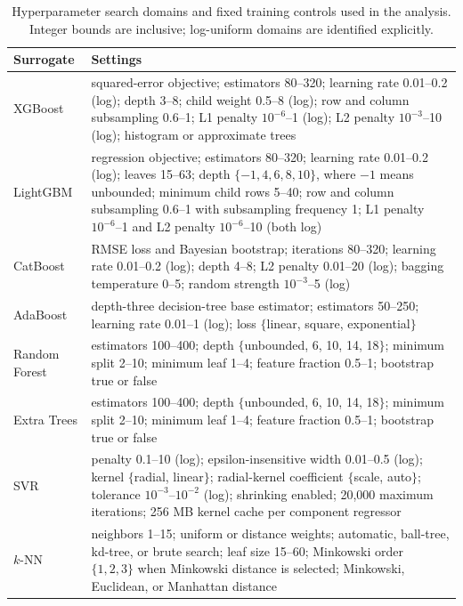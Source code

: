\documentclass[a4paper,fleqn]{cas-sc}
\newcommand{\csvcomma}{,}
\begin{document}
\begin{table}[htbp]
\centering
\caption{Hyperparameter search domains and fixed training controls used in the analysis. Integer bounds are inclusive; log-uniform domains are identified explicitly.}
\label{tab:model_hyperparameters}
\scriptsize
\setlength{\tabcolsep}{3pt}
\begin{tabular}{p{2.0cm}p{8.7cm}}
\hline
Surrogate & Settings \\
\hline
XGBoost & squared-error objective; estimators 80--320; learning rate 0.01--0.2 (log); depth 3--8; child weight 0.5--8 (log); row and column subsampling 0.6--1; L1 penalty $10^{-6}$--1 (log); L2 penalty $10^{-3}$--10 (log); histogram or approximate trees \\
LightGBM & regression objective; estimators 80--320; learning rate 0.01--0.2 (log); leaves 15--63; depth $\{-1\csvcomma{}4\csvcomma{}6\csvcomma{}8\csvcomma{}10\}$\csvcomma{} where $-1$ means unbounded; minimum child rows 5--40; row and column subsampling 0.6--1 with subsampling frequency 1; L1 penalty $10^{-6}$--1 and L2 penalty $10^{-6}$--10 (both log) \\
CatBoost & RMSE loss and Bayesian bootstrap; iterations 80--320; learning rate 0.01--0.2 (log); depth 4--8; L2 penalty 0.01--20 (log); bagging temperature 0--5; random strength $10^{-3}$--5 (log) \\
AdaBoost & depth-three decision-tree base estimator; estimators 50--250; learning rate 0.01--1 (log); loss $\{$linear\csvcomma{} square\csvcomma{} exponential$\}$ \\
Random Forest & estimators 100--400; depth $\{$unbounded\csvcomma{} 6\csvcomma{} 10\csvcomma{} 14\csvcomma{} 18$\}$; minimum split 2--10; minimum leaf 1--4; feature fraction 0.5--1; bootstrap true or false \\
Extra Trees & estimators 100--400; depth $\{$unbounded\csvcomma{} 6\csvcomma{} 10\csvcomma{} 14\csvcomma{} 18$\}$; minimum split 2--10; minimum leaf 1--4; feature fraction 0.5--1; bootstrap true or false \\
SVR & penalty 0.1--10 (log); epsilon-insensitive width 0.01--0.5 (log); kernel $\{$radial\csvcomma{} linear$\}$; radial-kernel coefficient $\{$scale\csvcomma{} auto$\}$; tolerance $10^{-3}$--$10^{-2}$ (log); shrinking enabled; 20\csvcomma{}000 maximum iterations; 256 MB kernel cache per component regressor \\
$k$-NN & neighbors 1--15; uniform or distance weights; automatic\csvcomma{} ball-tree\csvcomma{} kd-tree\csvcomma{} or brute search; leaf size 15--60; Minkowski order $\{1\csvcomma{}2\csvcomma{}3\}$ when Minkowski distance is selected; Minkowski\csvcomma{} Euclidean\csvcomma{} or Manhattan distance \\

\end{tabular}
\end{table}
\end{document}
